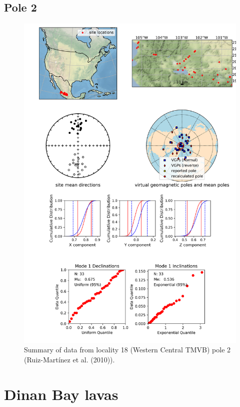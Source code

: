 \documentclass{article}
\begin{document}
\subsection{Pole 2}


\begin{figure}[H]
\centering
\includegraphics[width=5 in]{./18/2/pole_summary.png}
\caption{Summary of data from locality 18 (Western Central TMVB) pole 2 (Ruiz-Martínez et al. (2010)).}
\end{figure}

\section{Dinan Bay lavas}
\end{document}
